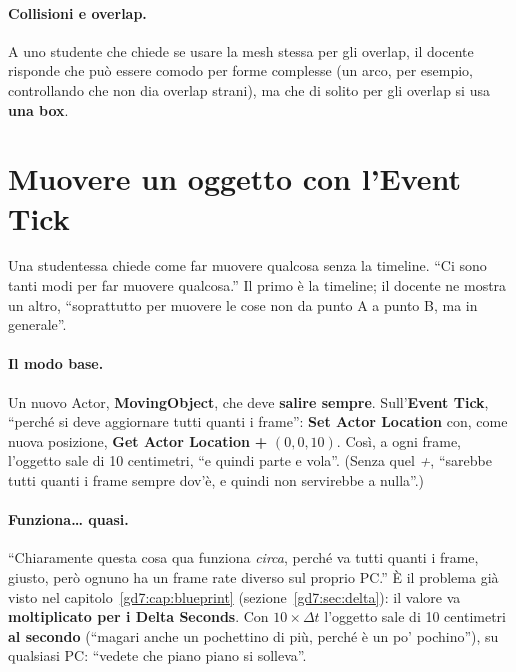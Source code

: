 \paragraph{Collisioni e overlap.} A uno studente che chiede se usare la mesh
stessa per gli overlap, il docente risponde che può essere comodo per forme
complesse (un arco, per esempio, controllando che non dia overlap strani), ma
che di solito per gli overlap si usa \textbf{una box}.

\section{Muovere un oggetto con l'Event Tick}
\label{gd12:sec:tick}

Una studentessa chiede come far muovere qualcosa senza la timeline. ``Ci sono
tanti modi per far muovere qualcosa.'' Il primo è la timeline; il docente ne
mostra un altro, ``soprattutto per muovere le cose non da punto A a punto B, ma
in generale''.

\paragraph{Il modo base.} Un nuovo Actor, \textbf{MovingObject}, che deve
\textbf{salire sempre}. Sull'\textbf{Event Tick}, ``perché si deve aggiornare
tutti quanti i frame'': \textbf{Set Actor Location} con, come nuova
posizione, \textbf{Get Actor Location} \textbf{+} $(0, 0, 10)$. Così, a ogni
frame, l'oggetto sale di 10 centimetri, ``e quindi parte e vola''. (Senza
quel \emph{+}, ``sarebbe tutti quanti i frame sempre dov'è, e quindi non
servirebbe a nulla''.)

\paragraph{Funziona\dots{} quasi.} ``Chiaramente questa cosa qua funziona
\emph{circa}, perché va tutti quanti i frame, giusto, però ognuno ha un frame
rate diverso sul proprio PC.'' È il problema già visto nel
capitolo~\ref{gd7:cap:blueprint} (sezione~\ref{gd7:sec:delta}): il valore va
\textbf{moltiplicato per i Delta Seconds}. Con $10 \times \Delta t$ l'oggetto
sale di 10 centimetri \textbf{al secondo} (``magari anche un pochettino di più,
perché è un po' pochino''), su qualsiasi PC: ``vedete che piano piano si
solleva''.

